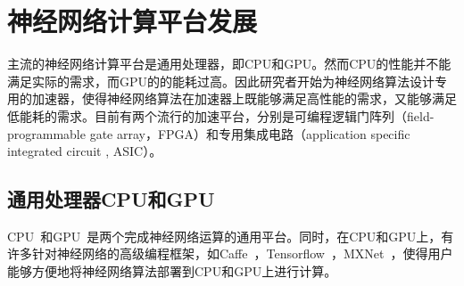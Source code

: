 %
%
%

\section{神经网络计算平台发展}

主流的神经网络计算平台是通用处理器，即CPU和GPU。然而CPU的性能并不能满足实际的需求，而GPU的的能耗过高。因此研究者开始为神经网络算法设计专用的加速器，使得神经网络算法在加速器上既能够满足高性能的需求，又能够满足低能耗的需求。目前有两个流行的加速平台，分别是可编程逻辑门阵列（field-programmable gate array，FPGA）和专用集成电路（application specific integrated circuit , ASIC）。

\subsection{通用处理器CPU和GPU}
CPU~\cite{chakradhar2010dynamically, vanhoucke2011improving}和GPU~\cite{farabet2009cnp, scherer2010accelerating, ciresan2011flexible, coates2013deep}是两个完成神经网络运算的通用平台。同时，在CPU和GPU上，有许多针对神经网络的高级编程框架，如Caffe~\cite{jia2014caffe}，Tensorflow~\cite{abadi2016tensorflow}，MXNet~\cite{chen2015mxnet}，使得用户能够方便地将神经网络算法部署到CPU和GPU上进行计算。

